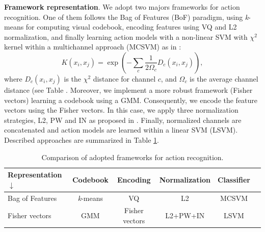 \textbf{Framework representation}. We adopt two majors frameworks for action recognition. One of them follows the Bag of Features (BoF) paradigm, using \textit{k}-means for computing visual codebook, encoding features using VQ and L2 normalization, and finally learning action models with a non-linear SVM with $\chi^2$ kernel within a multichannel approach (MCSVM) as in \cite{zhang2007}:
\begin{equation}
K(x_i,x_j)= \exp(-\sum_c {\frac{1}{2\Omega_c} D_c(x_i,x_j)}),
\label{eq:multichannel}
\end{equation}
where $D_c(x_i,x_j)$ is the $\chi^2$ distance for channel $c$, and $\Omega_c$ is the average channel distance (see Table . Moreover, we implement a more robust framework (Fisher vectors) learning a codebook using a GMM. Consequently, we encode the feature vectors using the Fisher vectors. In this case, we apply three normalization strategies, L2, PW and IN as proposed in \cite{xwang2013}. Finally, normalized channels are concatenated and action models are learned within a linear SVM (LSVM). Described approaches are summarized in Table \ref{tab:frameworks}.


\begin{table}[h!]
\caption{Comparison of adopted frameworks for action recognition.}
\begin{center}
{
\begin{tabular}{ l| c c c c c }
\hline
Representation $\downarrow$ & Codebook & Encoding & Normalization & Classifier \\
\hline
Bag of Features & \textit{k}-means & VQ & L2 & MCSVM \\
Fisher vectors & GMM & Fisher vectors & L2+PW+IN & LSVM \\
\hline
\end{tabular}
}
\end{center}
\label{tab:frameworks}
\end{table}


